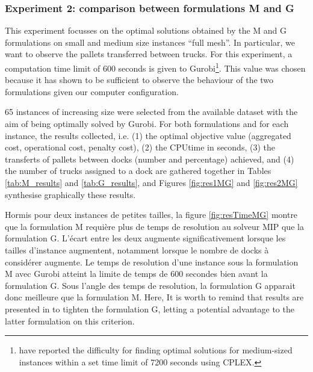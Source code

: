 \documentclass[preprint,12pt,authoryear]{elsarticle}
\begin{document}
\clearpage
\newpage
%
%
\subsubsection{Experiment 2: comparison between formulations M and G}\label{sec:resMG}

This experiment focusses on  the optimal solutions obtained by the M and G formulations on small and medium size instances
 ``full mesh''.
%
In particular, we want to observe the pallets transferred between trucks.
%
For this experiment, a computation time limit of 600 seconds is given to Gurobi\footnote{\citet{MIAO2009} have reported the difficulty for finding optimal solutions for medium-sized instances within a set time limit of 7200 seconds using CPLEX.}.
This value was chosen because it has shown to be sufficient to observe the behaviour of the two formulations given our computer configuration.

65 instances of increasing size were selected from the available dataset with the aim of being optimally solved by Gurobi.
%
For both formulations and for each instance, the results collected, i.e. 
(1) the optimal objective value (aggregated cost, operational cost, penalty cost), 
(2) the CPUtime in seconds,
(3) the transferts of pallets between docks (number and percentage) achieved,   and
(4) the number of trucks assigned to a dock
are gathered together in Tables \ref{tab:M_results} and \ref{tab:G_results}, and Figures \ref{fig:res1MG} and \ref{fig:res2MG} synthesise  graphically these results.

\color{red}


Hormis pour deux instances de petites tailles, la figure \ref{fig:resTimeMG} montre que la formulation M requière plus de temps de resolution au solveur MIP que la formulation G.
L'écart entre les deux augmente significativement lorsque les tailles d'instance augmentent, notamment lorsque le nombre de docks à considérer augmente.
Le temps de resolution d'une instance sous la formulation M avec Gurobi atteint la limite de temps de 600 secondes bien avant la formulation G.
Sous l'angle des temps de resolution, la formulation G apparait donc meilleure que la formulation M.
Here, It is worth to remind that results are presented in \citep{Gelareh2015,GELAREH2016} to tighten the formulation G, letting a potential advantage to the latter formulation on this criterion.
\end{document}

